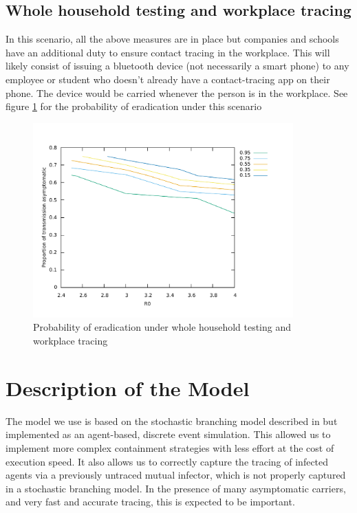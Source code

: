 \documentclass{article}
\begin{document}
\subsection{Whole household testing and workplace tracing}

In this scenario, all the above measures are in place but companies and schools have an additional duty to ensure contact tracing in the workplace. This will likely consist of issuing a bluetooth device (not necessarily a smart phone) to any employee or student who doesn't already have a contact-tracing app on their phone. The device would be carried whenever the person is in the workplace. See figure \ref{householdAndWorkplaceEnforcement} for the probability of eradication under this scenario

\begin{figure}
\begin{center}
\includegraphics[width = 10cm]{workplaceAndHouseholdEnforcement.pdf}
\end{center}
\caption{Probability of eradication under whole household testing and workplace tracing}
\label{householdAndWorkplaceEnforcement}
\end{figure}

\section{Description of the Model}

The model we use is based on the stochastic branching model described in \cite{hellewellfeasibility} but implemented as an agent-based, discrete event simulation. This allowed us to implement more complex containment strategies with less effort at the cost of execution speed. It also allows us to correctly capture the tracing of infected agents via a previously untraced mutual infector, which is not properly captured in a stochastic branching model. In the presence of many asymptomatic carriers, and very fast and accurate tracing, this is expected to be important.
\end{document}
